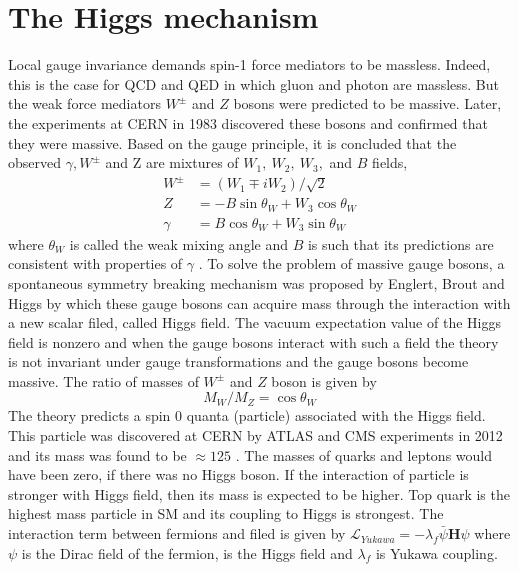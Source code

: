 \section{The Higgs mechanism}\label{sec:higgsMech}
Local gauge invariance demands spin-1 force mediators to be massless. Indeed, this is the case for QCD and QED in which gluon and photon are massless. But the weak force mediators $W^\pm$ and $Z$ bosons were predicted to be massive. Later, the experiments at CERN in 1983 \cite{ARNISON1983103}\cite{BANNER1983476}\cite{1983398}\cite{BAGNAIA1983130} discovered these bosons and confirmed that they were massive. 
Based on the gauge principle, it is concluded that the observed $\gamma, W^\pm$ and Z are mixtures of $W_1,\ W_2,\ W_3,$ and $B$ fields,
\begin{align}
W^\pm & = (W_1 \mp iW_2)/\sqrt{2}\\
Z & = -B\sin\theta_W + W_3\cos\theta_W\\
\gamma &= B\cos\theta_W + W_3\sin\theta_W
\end{align}
where $\theta_W$ is called the weak mixing angle and $B$ is such that its predictions are consistent with properties of $\gamma$ \cite{MartinShaw}. To solve the problem of massive gauge bosons, a spontaneous symmetry breaking mechanism was proposed by Englert, Brout and Higgs \cite{Higgs:1964pj}\cite{Englert:1964et} by which these gauge bosons can acquire mass through the interaction with a new scalar filed, called Higgs field. The vacuum expectation value of the Higgs field is nonzero and when the gauge bosons interact with such a field the theory is not invariant under gauge transformations and the gauge bosons become massive. The ratio of masses of $W^\pm$ and $Z$ boson is given by
\begin{equation}
M_W/M_Z = \cos \theta_W
\end{equation}
The theory predicts a spin 0 quanta (particle) associated with the Higgs field. This particle was discovered at CERN by ATLAS and CMS experiments in 2012 \cite{Aad:2012tfa}\cite{Chatrchyan:2012xdj} and its mass was found to be $\approx 125$ \gev. The masses of quarks and leptons would have been zero, if there was no Higgs boson. If the interaction of particle is stronger with Higgs field, then its mass is expected to be higher. Top quark is the highest mass particle in SM and its coupling to Higgs is strongest. The interaction term between fermions and \higgs filed is given by $\mathcal{L}_{Yukawa} = - \lambda_f \bar{\psi}\textbf{H}\psi$ where $\psi$ is the Dirac field of the fermion, \textbf{\higgs} is the Higgs field and $\lambda_f$ is Yukawa coupling.

